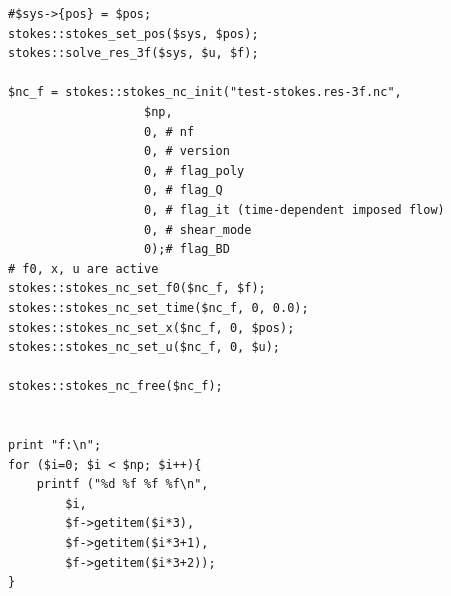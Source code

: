 \documentclass{book}
\begin{document}
{\begin{verbatim}
#$sys->{pos} = $pos;
stokes::stokes_set_pos($sys, $pos);
stokes::solve_res_3f($sys, $u, $f);

$nc_f = stokes::stokes_nc_init("test-stokes.res-3f.nc",
			       $np,
			       0, # nf
			       0, # version
			       0, # flag_poly
			       0, # flag_Q
			       0, # flag_it (time-dependent imposed flow)
			       0, # shear_mode
			       0);# flag_BD
# f0, x, u are active
stokes::stokes_nc_set_f0($nc_f, $f);
stokes::stokes_nc_set_time($nc_f, 0, 0.0);
stokes::stokes_nc_set_x($nc_f, 0, $pos);
stokes::stokes_nc_set_u($nc_f, 0, $u);

stokes::stokes_nc_free($nc_f);


print "f:\n";
for ($i=0; $i < $np; $i++){
    printf ("%d %f %f %f\n",
	    $i,
	    $f->getitem($i*3),
	    $f->getitem($i*3+1),
	    $f->getitem($i*3+2));
}
\end{verbatim}
}
\end{document}
